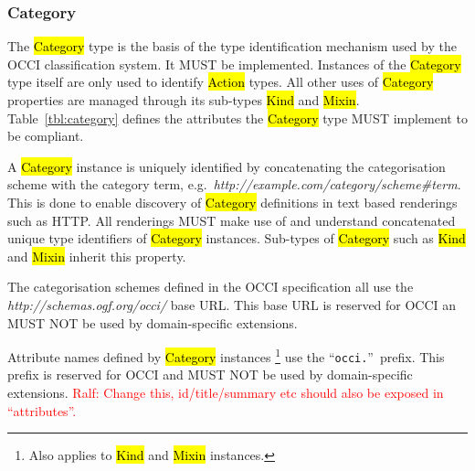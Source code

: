 \documentclass[10pt,a4paper]{article}
\newcommand{\ralf}[1]{\textcolor{red}{Ralf: #1}}
\begin{document}
\subsubsection{Category}
\label{sec:category}
The \hl{Category} type is the basis of the type
identification mechanism used by the
OCCI classification system. It MUST be implemented. Instances of the
\hl{Category} type itself are only used to identify \hl{Action} types. All
other uses of \hl{Category} properties are managed through its sub-types
\hl{Kind} and \hl{Mixin}.
%
Table~\ref{tbl:category} defines the attributes the \hl{Category} type MUST
implement to be compliant.


A \hl{Category} instance is uniquely identified by concatenating the
categorisation scheme with the category term,
e.g.~\textit{http://example.com/category/scheme\#term}.
This is done to enable discovery of \hl{Category} definitions in text based
renderings such as HTTP. All renderings MUST make use of and understand
concatenated unique type identifiers of \hl{Category} instances.
%
Sub-types of \hl{Category} such as \hl{Kind} and \hl{Mixin} inherit this property.

The categorisation schemes defined in the OCCI specification all use the
\textit{http://schemas.ogf.org/occi/} base URL. This base URL is reserved for
OCCI an MUST NOT be used by domain-specific extensions.

Attribute names defined by \hl{Category} instances%
\footnote{Also applies to \hl{Kind} and \hl{Mixin} instances.}
use the ``\texttt{occi.}''~prefix.  This prefix is reserved for OCCI and MUST NOT
be used by domain-specific extensions.
\ralf{Change this, id/title/summary etc should also be exposed in ``attributes''.}
\end{document}
